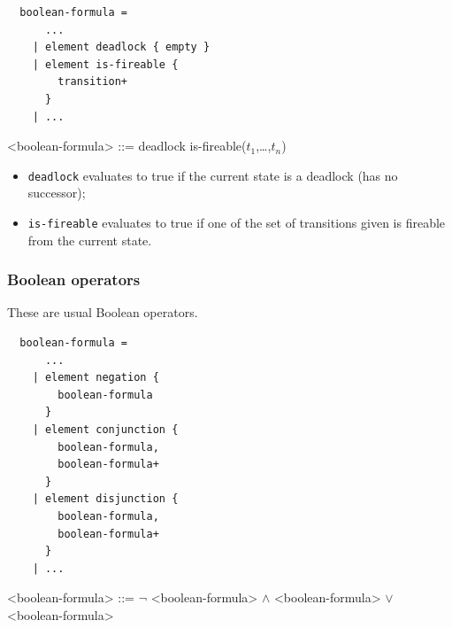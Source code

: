 \documentclass[10pt,english,a4paper]{article}
\begin{document}
\begin{multicols}{2}
\begin{lstlisting}
  boolean-formula =
      ...
    | element deadlock { empty }
    | element is-fireable {
        transition+
      }
    | ...
\end{lstlisting}
\columnbreak
\scriptsize\begin{grammar}
<boolean-formula> ::= deadlock
\alt is-fireable($t_1$,\dots,$t_n$)
\end{grammar}
\end{multicols}


\begin{itemize}
  \item \lstinline!deadlock! evaluates to true if the current state is a deadlock
    (has no successor);
  \item \lstinline!is-fireable! evaluates to true if one of the set of transitions given
    is fireable from the current state.
\end{itemize}

\subsubsection{Boolean operators}

These are usual Boolean operators.


\begin{multicols}{2}
\begin{lstlisting}
  boolean-formula =
      ...
    | element negation {
        boolean-formula
      }
    | element conjunction {
        boolean-formula,
        boolean-formula+
      }
    | element disjunction {
        boolean-formula,
        boolean-formula+
      }
    | ...
\end{lstlisting}
\columnbreak
\scriptsize\begin{grammar}
<boolean-formula> ::= $\lnot$ <boolean-formula>
 $\wedge$ <boolean-formula>
 $\vee$ <boolean-formula>
\end{grammar}
\end{multicols}
\end{document}
